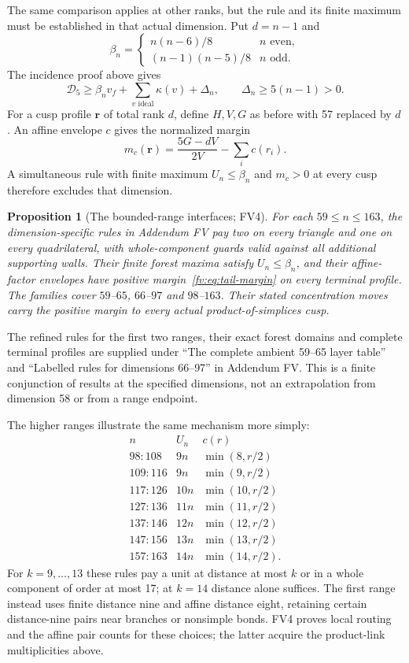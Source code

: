 \documentclass[11pt]{article}
\newtheorem{proposition}[theorem]{Proposition}
\theoremstyle{remark}\newtheorem{remark}[theorem]{Remark}
\numberwithin{equation}{section}
\newcommand{\Dfive}{\mathcal D_5}
\begin{document}
The same comparison applies at other ranks, but the rule and its
finite maximum must be established in that actual dimension. Put
$d=n-1$ and
\[
 \beta_n=\begin{cases}n(n-6)/8&n\text{ even},\\
 (n-1)(n-5)/8&n\text{ odd}.
 \end{cases}
\]
The incidence proof above gives
\[
 \Dfive\ge\beta_n v_f+\sum_{v\text{ ideal}}\kappa(v)+\Delta_n,
 \qquad\Delta_n\ge5(n-1)>0.
\]
For a cusp profile $\boldsymbol r$ of total rank $d$, define
$H,V,G$ as before with 57 replaced by $d$. An affine envelope
$c$ gives the normalized margin
\begin{equation}\label{fv:eq:tail-margin}
 m_c(\boldsymbol r)=\frac{5G-dV}{2V}-\sum_i c(r_i).
\end{equation}
A simultaneous rule with finite maximum $U_n\le\beta_n$ and
$m_c>0$ at every cusp therefore excludes that dimension.

\begin{proposition}[The bounded-range interfaces; FV4]
For each $59\le n\le163$, the dimension-specific rules in
Addendum FV pay two on every triangle and one on every
quadrilateral, with whole-component guards valid against all
additional supporting walls. Their finite forest maxima satisfy
$U_n\le\beta_n$, and their affine-factor envelopes have positive
margin~\eqref{fv:eq:tail-margin} on every terminal profile.
The families cover $59$--$65$, $66$--$97$ and $98$--$163$.
Their stated concentration moves carry the positive margin to
every actual product-of-simplices cusp.
\end{proposition}

The refined rules for the first two ranges, their exact forest
domains and complete terminal profiles are supplied under
``The complete ambient 59--65 layer table'' and ``Labelled rules
for dimensions 66--97'' in Addendum FV. This is a finite
conjunction of results at the specified dimensions, not an
extrapolation from dimension 58 or from a range endpoint.

The higher ranges illustrate the same mechanism more simply:
\[
\begin{array}{c|c|c}
 n&U_n&c(r)\\\hline
 98\!:\!108&9n&\min(8,r/2)\\
 109\!:\!116&9n&\min(9,r/2)\\
 117\!:\!126&10n&\min(10,r/2)\\
 127\!:\!136&11n&\min(11,r/2)\\
 137\!:\!146&12n&\min(12,r/2)\\
 147\!:\!156&13n&\min(13,r/2)\\
 157\!:\!163&14n&\min(14,r/2).
\end{array}
\]
For $k=9,\ldots,13$ these rules pay a unit at distance at most
$k$ or in a whole component of order at most 17; at $k=14$
distance alone suffices. The first range instead uses finite
distance nine and affine distance eight, retaining certain
distance-nine pairs near branches or nonsimple bonds. FV4 proves
local routing and the affine pair counts for these choices;
the latter acquire the product-link multiplicities above.
\end{document}
